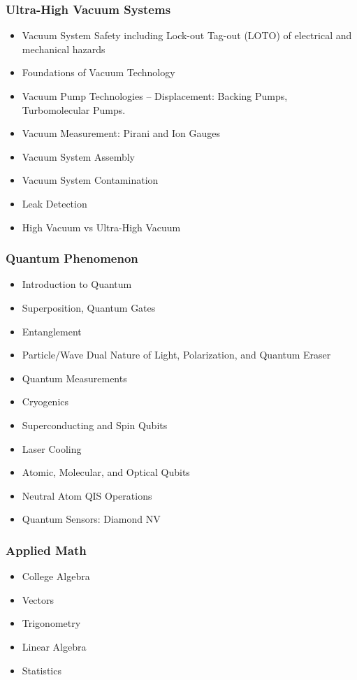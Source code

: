 \documentclass{beamer}
\begin{document}
\begin{frame}\frametitle{Ultra-High Vacuum Systems}
\begin{itemize}
\item Vacuum System Safety including Lock-out Tag-out (LOTO) of electrical and mechanical hazards
\item Foundations of Vacuum Technology
\item Vacuum Pump Technologies – Displacement: Backing Pumps, Turbomolecular Pumps.
\item Vacuum Measurement: Pirani and Ion Gauges
\item Vacuum System Assembly
\item Vacuum System Contamination
\item Leak Detection
\item High Vacuum vs Ultra-High Vacuum

\end{itemize}
\end{frame}

\begin{frame}\frametitle{Quantum Phenomenon}
\begin{itemize}
\item Introduction to Quantum 
\item Superposition, Quantum Gates
\item Entanglement
\item Particle/Wave Dual Nature of Light, Polarization, and Quantum Eraser
\item Quantum Measurements
\item Cryogenics
\item Superconducting and Spin Qubits
\item Laser Cooling
\item Atomic, Molecular, and Optical Qubits
\item Neutral Atom QIS Operations
\item Quantum Sensors: Diamond NV
\end{itemize}
\end{frame}

\begin{frame}\frametitle{Applied Math}
\begin{itemize}
\item College Algebra
\item Vectors
\item Trigonometry
\item Linear Algebra
\item Statistics
\end{itemize}
\end{frame}
\end{document}
